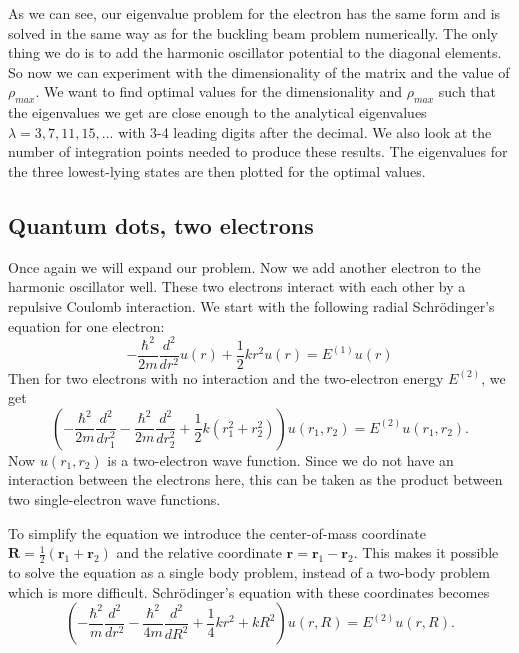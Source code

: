 \documentclass[12pt,a4paper,english]{article}
\begin{document}
As we can see, our eigenvalue problem for the electron has the same form and is solved in the same way as for the buckling beam problem numerically. The only thing we do is to add the harmonic oscillator potential to the diagonal elements. So now we can experiment with the dimensionality of the matrix and the value of $\rho_{max}$. We want to find optimal values for the dimensionality and $\rho_{max}$ such that the eigenvalues we get are close enough to the analytical eigenvalues $\lambda=3,7,11,15,...$ with 3-4 leading digits after the decimal. We also look at the number of integration points needed to produce these results. The eigenvalues for the three lowest-lying states are then plotted for the optimal values.

\subsection{Quantum dots, two electrons}
\label{sect:quantum_two}
Once again we will expand our problem. Now we add another electron to the harmonic oscillator well. These two electrons interact with each other by a repulsive Coulomb interaction. We start with the following radial Schrödinger's equation for one electron:
\begin{equation}
\label{eq:schr_single_2}
-\frac{\hbar^2}{2m}\frac{d^2}{dr^2}u(r)+\frac{1}{2}kr^2u(r)=E^{(1)}u(r)
\end{equation}
Then for two electrons with no interaction and the two-electron energy $E^{(2)}$, we get
\begin{equation}
\label{eq:schr_double_2}
\left(-\frac{\hbar^2}{2m}\frac{d^2}{dr_1^2}-\frac{\hbar^2}{2m}\frac{d^2}{dr_2^2}+\frac{1}{2}k(r_1^2+r_2^2)\right)u(r_1,r_2)=E^{(2)}u(r_1,r_2).
\end{equation}
Now $u(r_1,r_2)$ is a two-electron wave function. Since we do not have an interaction between the electrons here, this can be taken as the product between two single-electron wave functions.

To simplify the equation we introduce the center-of-mass coordinate $\textbf{R}=\frac{1}{2}(\textbf{r}_1+\textbf{r}_2)$ and the relative coordinate $\textbf{r}=\textbf{r}_1-\textbf{r}_2$. This makes it possible to solve the equation as a single body problem, instead of a two-body problem which is more difficult. Schrödinger's equation with these coordinates becomes
\begin{equation}
\label{eq:schr_CM}
\left(-\frac{\hbar^2}{m}\frac{d^2}{dr^2}-\frac{\hbar^2}{4m}\frac{d^2}{dR^2}+\frac{1}{4}kr^2+kR^2\right)u(r,R)=E^{(2)}u(r,R).
\end{equation}
\end{document}
